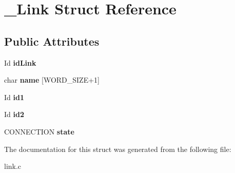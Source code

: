 \hypertarget{struct__Link}{}\section{\+\_\+\+Link Struct Reference}
\label{struct__Link}
\subsection*{Public Attributes}
\begin{DoxyCompactItemize}
\item 
\mbox{\label{struct__Link_a9bf0c611b972c32f57f4685253723f9e}} 
Id {\bfseries id\+Link}
\item 
\mbox{\label{struct__Link_a020ee863120055b29609157b9de3c84d}} 
char {\bfseries name} \mbox{[}W\+O\+R\+D\+\_\+\+S\+I\+ZE+1\mbox{]}
\item 
\mbox{\label{struct__Link_a62d6aee205ac5d4d738bb7448fbaf9cc}} 
Id {\bfseries id1}
\item 
\mbox{\label{struct__Link_a9d8710f0f005598c8d6a1b48d5bf07d7}} 
Id {\bfseries id2}
\item 
\mbox{\label{struct__Link_a22b24f470b48e4b56a8665d649cf26c7}} 
C\+O\+N\+N\+E\+C\+T\+I\+ON {\bfseries state}
\end{DoxyCompactItemize}


The documentation for this struct was generated from the following file\+:\begin{DoxyCompactItemize}
\item 
link.\+c\end{DoxyCompactItemize}
